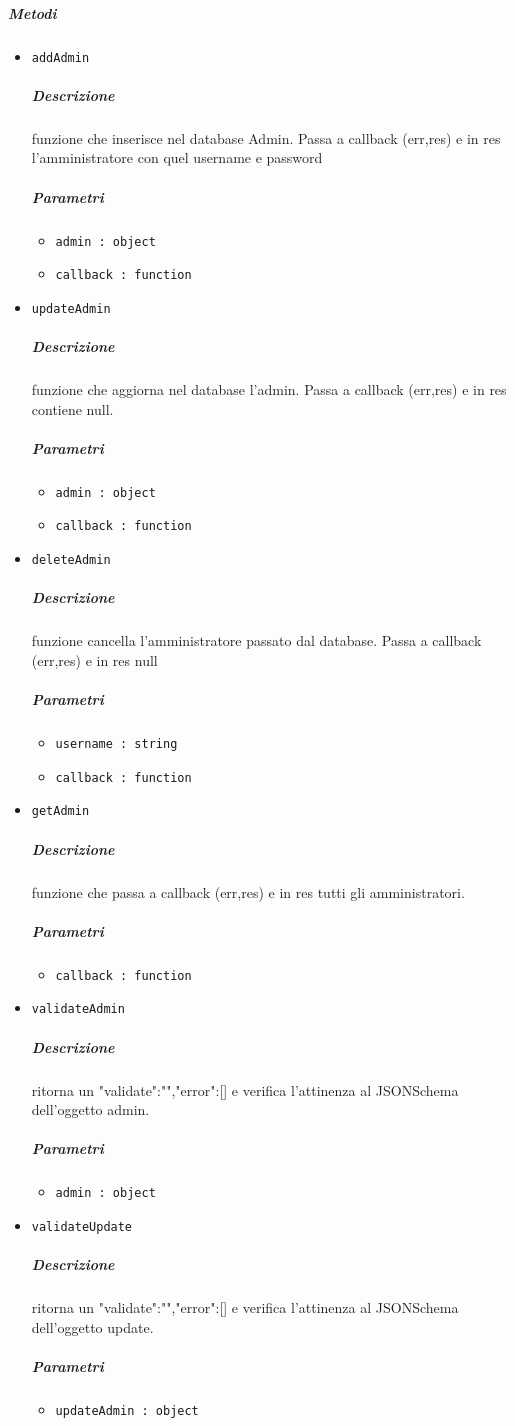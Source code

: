 \documentclass[../ManualeSviluppatore_v1.0.0.tex]{subfiles}
\begin{document}
\subparagraph{Metodi}\begin{itemize}
\item \texttt{addAdmin}
\subparagraph{Descrizione} funzione che inserisce nel database Admin. Passa a callback (err,res) e in res l'amministratore con quel username e password
\subparagraph{Parametri} \begin{itemize}
\item \texttt{admin : object}
\item \texttt{callback : function}
\end{itemize}
\item \texttt{updateAdmin}
\subparagraph{Descrizione} funzione che aggiorna nel database l'admin. Passa a callback (err,res) e in res contiene null.
\subparagraph{Parametri} \begin{itemize}
\item \texttt{admin : object}
\item \texttt{callback : function}
\end{itemize}
\item \texttt{deleteAdmin}
\subparagraph{Descrizione} funzione cancella l'amministratore passato dal database. Passa a callback (err,res) e in res null
\subparagraph{Parametri} \begin{itemize}
\item \texttt{username : string}
\item \texttt{callback : function}
\end{itemize}
\item \texttt{getAdmin}
\subparagraph{Descrizione} funzione che passa a callback (err,res) e in res tutti gli amministratori.
\subparagraph{Parametri} \begin{itemize}
\item \texttt{callback : function}
\end{itemize}
\item \texttt{validateAdmin}
\subparagraph{Descrizione} ritorna un {"validate":"","error":[]} e verifica l'attinenza al JSONSchema dell'oggetto admin.
\subparagraph{Parametri} \begin{itemize}
\item \texttt{admin : object}
\end{itemize}
\item \texttt{validateUpdate}
\subparagraph{Descrizione} ritorna un {"validate":"","error":[]} e verifica l'attinenza al JSONSchema dell'oggetto update.
\subparagraph{Parametri} \begin{itemize}
\item \texttt{updateAdmin : object}
\end{itemize}
\end{itemize}
\end{document}
